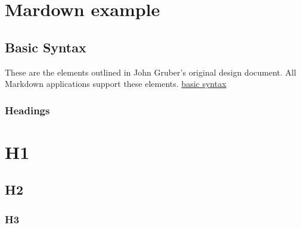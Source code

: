 \begin{Shaded}
\begin{Highlighting}[]








\end{Highlighting}
\end{Shaded}

\hypertarget{mardown-example}{%
\section{Mardown example}\label{mardown-example}}

\hypertarget{basic-syntax}{%
\subsection{Basic Syntax}\label{basic-syntax}}

These are the elements outlined in John Gruber's original design
document. All Markdown applications support these elements.
\href{https://www.markdownguide.org/basic-syntax}{basic syntax}

\hypertarget{headings}{%
\subsubsection{Headings}\label{headings}}

\hypertarget{h1}{%
\section{H1}\label{h1}}

\hypertarget{h2}{%
\subsection{H2}\label{h2}}

\hypertarget{h3}{%
\subsubsection{H3}\label{h3}}

